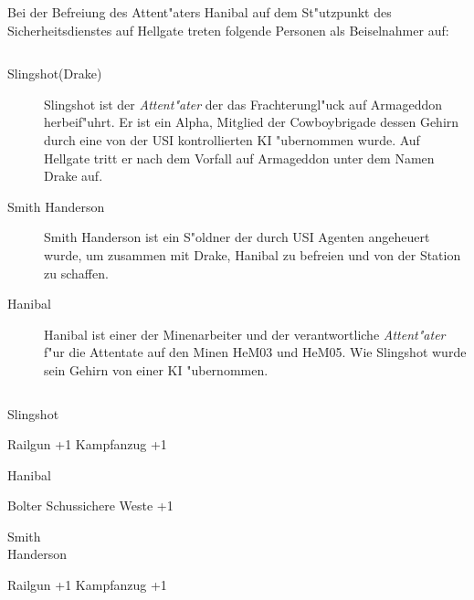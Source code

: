 
Bei der Befreiung des Attent"aters Hanibal auf dem St"utzpunkt des Sicherheitsdienstes auf Hellgate treten folgende Personen 
als Beiselnahmer auf:

\begin{column}[l]{0.45}
    \begin{description}
        \item[Slingshot(Drake)] Slingshot ist der \emph{Attent"ater} der das Frachterungl"uck auf Armageddon herbeif"uhrt. Er ist 
            ein Alpha, Mitglied der Cowboybrigade dessen Gehirn durch eine von der USI kontrollierten KI "ubernommen wurde. 
            Auf Hellgate tritt er nach dem Vorfall auf Armageddon unter dem Namen Drake auf.
        \item[Smith Handerson] Smith Handerson ist ein S"oldner der durch USI Agenten angeheuert wurde, um 
            zusammen mit Drake, Hanibal zu befreien und von der Station zu schaffen.
        \item[Hanibal] Hanibal ist einer der Minenarbeiter und der verantwortliche \emph{Attent"ater} f"ur die Attentate auf den Minen 
            HeM03 und HeM05. Wie Slingshot wurde sein Gehirn von einer KI "ubernommen.
    \end{description}
\end{column}
\begin{column}[r]{0.45}
    \begin{nscsheet}[h]{Slingshot}
        \nscstats[ATT=1,AGG=2,DEX=3]
        \nscruler
        \begin{nscinventory}
            \nscitem[Waffen] Railgun +1
            \nscitem[R"ustung] Kampfanzug +1
        \end{nscinventory}
    \end{nscsheet}    

    \begin{nscsheet}[h]{Hanibal}
        \nscstats[ATT=1,AGG=2,DEX=3,COM=2,CON=2]
        \nscruler
        \begin{nscinventory}
            \nscitem[Waffen] Bolter
            \nscitem[R"ustung] Schussichere Weste +1
        \end{nscinventory}
    \end{nscsheet} 

    \begin{nscsheet}[h]{Smith\\ Handerson}
        \nscstats[ATT=3,AGG=2]
        \nscruler
        \begin{nscinventory}
            \nscitem[Waffen] Railgun +1
            \nscitem[R"ustung] Kampfanzug +1
        \end{nscinventory}
    \end{nscsheet}
\end{column}

\newpage